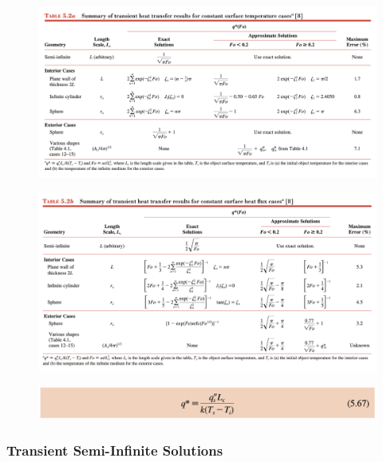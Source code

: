 \documentclass[12pt,letterpaper]{article}
\begin{document}
\begin{figure}[!htpb]
    \centering
    \includegraphics[width=0.95\linewidth]{./image50.png}
\end{figure}

\begin{figure}[!htpb]
    \centering
    \includegraphics[width=0.95\linewidth]{./image51.png}
\end{figure}


\begin{figure}[!htpb]
    \centering
    \includegraphics[width=0.95\linewidth]{./image53.png}
\end{figure}


\clearpage
\subsubsection*{Transient Semi-Infinite Solutions}
\end{document}
